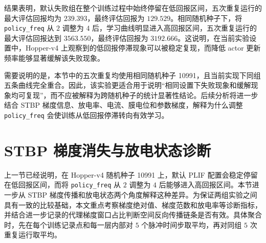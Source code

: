 \documentclass[UTF8,zihao=-4,oneside,openany]{ctexbook}
\begin{document}
结果表明，默认失败组在整个训练过程中始终停留在低回报区间，五次重复运行的最大评估回报均为 $239.393$，最终评估回报为 $129.529$。相同随机种子下，将 \texttt{policy\_freq} 从 $2$ 调整为 $4$ 后，学习曲线明显进入高回报区间，五次重复运行的最大评估回报达到 $3563.550$，最终评估回报为 $3192.666$。这说明，在当前实验设置中，Hopper-v4 上观察到的低回报停滞现象可以被稳定复现，而降低 actor 更新频率能够显著缓解该失败现象。

需要说明的是，本节中的五次重复均使用相同随机种子 10991，且当前实现下同组五条曲线完全重合。因此，该实验更适合用于说明“相同设置下失败现象和缓解现象均可复现”，而不应被解释为跨随机种子的统计显著性结论。后续分析将进一步结合 STBP 梯度信息、放电率、电流、膜电位和参数梯度，解释为什么调整 \texttt{policy\_freq} 会使训练从低回报停滞转向有效学习。

\section{STBP 梯度消失与放电状态诊断}
上一节已经说明，在 Hopper-v4 随机种子 10991 上，默认 PLIF 配置会稳定停留在低回报区间，而将 \texttt{policy\_freq} 从 $2$ 调整为 $4$ 后能够进入高回报区间。本节进一步从 STBP 梯度传播和放电状态两个角度解释这种差异。为保证两组实验之间具有一致的比较基础，本文重点考察梯度绝对值、梯度范数和放电率等诊断指标，并结合进一步记录的代理梯度窗口占比判断空间反向传播链条是否有效。具体聚合时，先在每个训练记录点和每一层内部对 $5$ 个脉冲时间步取平均，再对同组 $5$ 次重复运行取平均。
\end{document}
